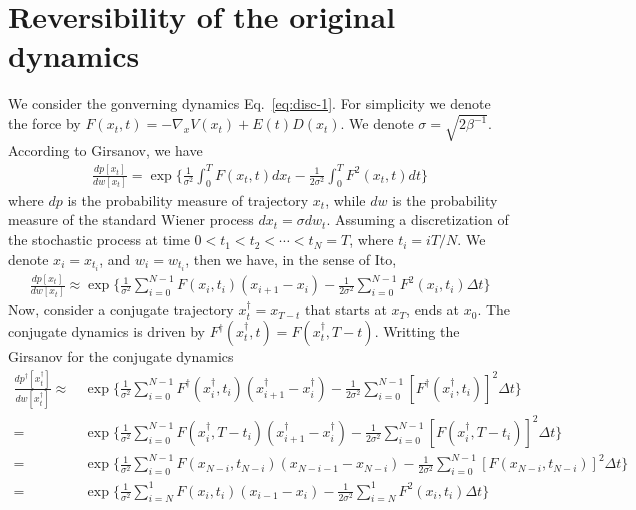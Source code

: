 \documentclass[aps, pre, preprint,unsortedaddress,a4paper,onecolumn]{revtex4}
\newcommand{\dt}[0]{\Delta t}
\begin{document}
\appendix



\section{Reversibility of the original dynamics}
\label{sec:revs}

We consider the gonverning dynamics Eq.~\eqref{eq:disc-1}.
For simplicity we denote the force by $F(x_t,t) = -\nabla_x V(x_t)+ E(t)D(x_t) $.  We denote $\sigma =  \sqrt{2\beta^{-1}} $.
According to Girsanov, we have
\begin{align}
  \label{eq:tmp8}
  \frac{dp[x_t]}{dw[x_t]}  =
  \exp \bigg\{
  \frac 1{\sigma^2}\int_0^T F(x_t,t) dx_t -
  \frac1{2\sigma^2}\int_0^T F^2(x_t,t) dt
  \bigg\}
\end{align}
where $dp$ is the probability measure of trajectory $x_t$, while $dw$ is the
probability measure of the standard Wiener process $dx_t = \sigma dw_t$.
Assuming a discretization of the
stochastic process at time $0 < t_1 < t_2 < \cdots < t_N = T$, where
$t_i = iT / N$. We denote $x_i = x_{t_i}$, and $w_i = w_{t_i}$, then we have,
in the sense of Ito,
\begin{align}\label{eq:tmp9}
  \frac{dp[x_t]}{dw[x_t]}  \approx
  \exp\bigg\{\frac1{\sigma^2}\sum_{i=0}^{N-1} F(x_{i},t_{i})(x_{i+1} - x_i) -\frac1{2\sigma^2}\sum_{i=0}^{N-1}F^2(x_i,t_i)\dt\bigg\} 
\end{align}
Now, consider a conjugate trajectory $x^\dagger_t = x_{T-t}$ that starts at $x_T$, ends at $x_0$. The conjugate dynamics is driven by  $F^\dagger(x^\dagger_t,t) = F(x^\dagger_t, T-t)$.
Writting the Girsanov for the conjugate dynamics
\begin{align}\label{eq:dagger-0}
  \frac{dp^\dagger[x^\dagger_t]}{dw[x^\dagger_t]}  
  \approx\,&
  \exp\bigg\{
  \frac1{\sigma^2}\sum_{i=0}^{N-1} F^\dagger(x^\dagger_{i},t_{i})(x^\dagger_{i+1} - x^\dagger_i) -
  \frac1{2\sigma^2}\sum_{i=0}^{N-1}[F^\dagger(x^\dagger_i,t_i)]^2\dt\bigg\} \\ \nonumber
  =\,&
  \exp\bigg\{
  \frac1{\sigma^2}\sum_{i=0}^{N-1} F(x^\dagger_{i},T - t_{i})(x^\dagger_{i+1} - x^\dagger_i) -
  \frac1{2\sigma^2}\sum_{i=0}^{N-1}[F(x^\dagger_i, T-t_i)]^2\dt\bigg\} \\\nonumber
  =\,&
  \exp\bigg\{
  \frac1{\sigma^2}\sum_{i=0}^{N-1} F(x_{N-i},t_{N-i})(x_{N-i-1} - x_{N-i}) -
  \frac1{2\sigma^2}\sum_{i=0}^{N-1}[F(x_{N-i},t_{N-i})]^2\dt\bigg\} \\
  = \,&
  \exp\bigg\{
  \frac1{\sigma^2}\sum_{i=N}^{1} F(x_{i},t_{i})(x_{i-1} - x_i) -
  \frac1{2\sigma^2}\sum_{i=N}^{1}F^2(x_i,t_i)\dt\bigg\}
\end{align}
\end{document}
